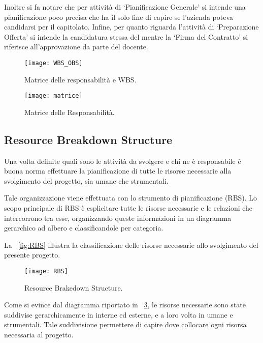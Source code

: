 Inoltre si fa notare che per attività di `Pianificazione Generale' si intende una pianificazione poco precisa che ha il solo fine di capire se l'azienda poteva candidarsi per il capitolato. Infine, per quanto riguarda l'attività di `Preparazione Offerta' si intende la candidatura stessa del  mentre la `Firma del Contratto' si riferisce all'approvazione da parte del docente.


\begin{figure}[h]
  \texttt{[image: WBS\_OBS]}
	\caption{Matrice delle responsabilità e WBS.}
	\label{fig:WBS_OBS}
\end{figure} 

\begin{figure}[p]
  \texttt{[image: matrice]}
	\caption{Matrice delle Responsabilità.}
  \label{fig:MATR}
\end{figure}

\subsection{Resource Breakdown Structure}
Una volta definite quali sono le attività da svolgere e chi ne è responsabile è buona norma effettuare la pianificazione di tutte le risorse necessarie alla svolgimento del progetto, sia umane che strumentali.

Tale organizzazione viene effettuata con lo strumento di pianificazione  (RBS).
Lo scopo principale di RBS è esplicitare tutte le risorse necessarie e le relazioni che intercorrono tra esse, organizzando queste informazioni in un diagramma gerarchico ad albero e classificandole per categoria.

La \figurename~\vref{fig:RBS} illustra la classificazione delle risorse necessarie allo svolgimento del presente progetto.

\begin{landscape}
\vskip 2in

\begin{figure}[p]
\centering
  \texttt{[image: RBS]}
	\caption{Resource Brakedown Structure.}
	\label{fig:RBS}
\end{figure}

\end{landscape}

Come si evince dal diagramma riportato in \figurename~\ref{fig:RBS}, le risorse necessarie sono state suddivise gerarchicamente in interne ed esterne, e a loro volta in umane e strumentali. Tale suddivisione permettere di capire dove collocare ogni risorsa necessaria al progetto.


